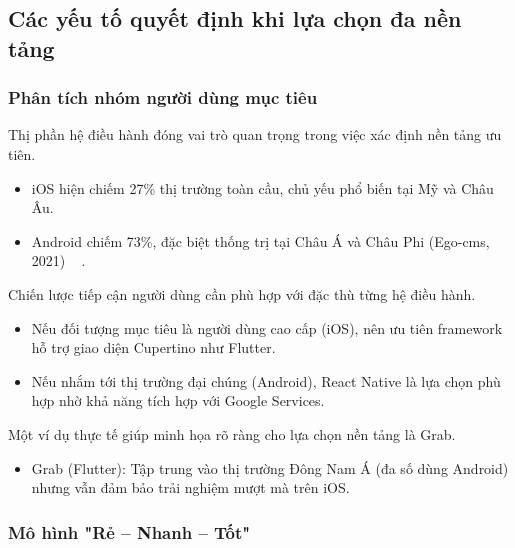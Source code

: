 \subsection{Các yếu tố quyết định khi lựa chọn đa nền tảng}
\renewcommand{\labelitemi}{--}    


  \subsubsection{Phân tích nhóm người dùng mục tiêu}
    
      Thị phần hệ điều hành đóng vai trò quan trọng trong việc xác định nền tảng ưu tiên.
      \setlength{\leftmargini}{1.5cm}
      \begin{itemize}
        \item iOS hiện chiếm 27\% thị trường toàn cầu, chủ yếu phổ biến tại Mỹ và Châu Âu.
        \item Android chiếm 73\%, đặc biệt thống trị tại Châu Á và Châu Phi (Ego-cms, 2021) ~\cite{egoMarketShare} .
      \end{itemize}
    \vspace{0.5em}

    
      Chiến lược tiếp cận người dùng cần phù hợp với đặc thù từng hệ điều hành.
      \setlength{\leftmargini}{1.5cm}
      \begin{itemize}
          \item Nếu đối tượng mục tiêu là người dùng cao cấp (iOS), nên ưu tiên framework hỗ trợ giao diện Cupertino như Flutter.
          \item Nếu nhắm tới thị trường đại chúng (Android), React Native là lựa chọn phù hợp nhờ khả năng tích hợp với Google Services.
      \end{itemize}
    \vspace{0.5em}

    
      Một ví dụ thực tế giúp minh họa rõ ràng cho lựa chọn nền tảng là Grab.
      \setlength{\leftmargini}{1.5cm}
      \begin{itemize}
          \item Grab (Flutter): Tập trung vào thị trường Đông Nam Á (đa số dùng Android) nhưng vẫn đảm bảo trải nghiệm mượt mà trên iOS.
      \end{itemize}

    \subsubsection{Mô hình "Rẻ – Nhanh – Tốt"}
    

